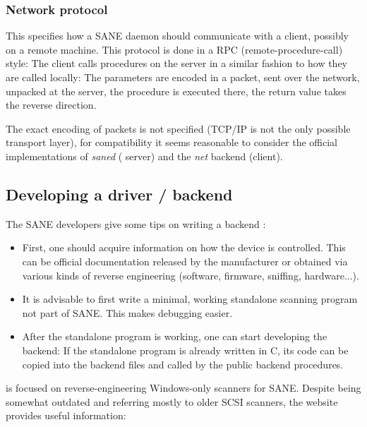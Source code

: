 \documentclass{article}
\begin{document}
\subsubsection{Network protocol}

This specifies how a SANE daemon should communicate with a client, possibly on a
remote machine. This protocol is done in a RPC (remote-procedure-call) style:
The client calls procedures on the server in a similar fashion to how they are
called locally: The parameters are encoded in a packet, sent over the network,
unpacked at the server, the procedure is executed there, the return value takes
the reverse direction.

The exact encoding of packets is not specified (TCP/IP is not the only possible
transport layer), for compatibility it seems reasonable to consider the official
implementations of {\it saned} ( server) and the {\it net} backend (client). \cite[5]{sane_standard}

\subsection{Developing a driver / backend}

The SANE developers give some tips on writing a backend \cite{sane_develop}:

\begin{itemize}
  \item First, one should acquire information on how the device is controlled. This
        can be official documentation released by the manufacturer or obtained via
        various kinds of reverse engineering (software, firmware, sniffing, hardware...).
  \item It is advisable to first write a minimal, working standalone scanning program not part of SANE.
        This makes debugging easier.
  \item After the standalone program is working, one can start developing the backend:
        If the standalone program is already written in C, its code can be copied
        into the backend files and called by the public backend procedures.
\end{itemize}

\cite{sane_develop_re} is focused on reverse-engineering
Windows-only scanners for SANE. Despite being somewhat outdated and referring mostly
to older SCSI scanners, the website provides useful information:
\end{document}
